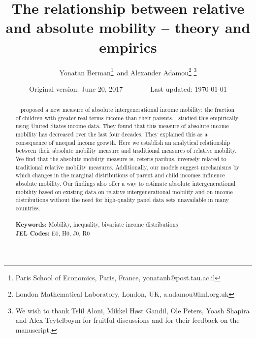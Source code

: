 \documentclass[12pt]{article}
\numberwithin{equation}{section}
\begin{document}
\onehalfspacing

\begin{titlepage}
\title{The relationship between relative and absolute mobility -- theory and empirics}
\author{Yonatan Berman\footnote{Paris School of Economics, Paris, France, yonatanb@post.tau.ac.il}\, and Alexander Adamou\footnote{London Mathematical Laboratory, London, UK, a.adamou@lml.org.uk} \thanks{We wish to thank Tslil Aloni, Mikkel H\o st Gandil, Ole Peters, Yoash Shapira and Alex Teytelboym for fruitful discussions and for their feedback on the manuscript.}}
\date{Original version: June 20, 2017\,\,\,\,\,\,\,\,\,\,\,\,\,\,\,\,\,\,\,\,\,\,\,\,Last updated: \today}
\maketitle
\begin{abstract}
\noindent~\citet{chetty2014land} proposed a new measure of absolute intergenerational income mobility: the fraction of children with greater real-terms income than their parents.~\citet{chetty2017fading} studied this empirically using United States income data. They found that this measure of absolute income mobility has decreased over the last four decades. %
They explained this as a consequence of unequal income growth. Here we establish an analytical relationship between their absolute mobility measure and traditional measures of relative mobility. %
We find that the absolute mobility measure is, ceteris paribus, inversely related to traditional relative mobility measures. Additionally, our models suggest mechanisms by which changes in the marginal distributions of parent and child incomes influence absolute mobility. Our findings also offer a way to estimate absolute intergenerational mobility based on existing data on relative intergenerational mobility and on income distributions without the need for high-quality panel data sets unavailable in many countries.
\\
\\
\noindent\textbf{Keywords:} Mobility, inequality, bivariate income distributions
\\
\noindent\textbf{JEL Codes:} E0, H0, J0, R0\\

\bigskip
\end{abstract}
\setcounter{page}{0}
\thispagestyle{empty}
\end{titlepage}
\pagebreak \newpage
\end{document}
